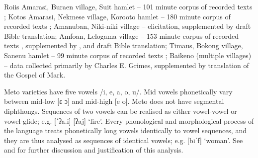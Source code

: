 \documentclass[output=paper]{langscibook}
\begin{document}
\begin{exe}
	\label{ex:SouMetDat}
 \ea Roi{\Q}is Amarasi, Buraen village, Suit hamlet
					 -- 101 minute corpus of recorded texts \citep{ed14-RoqisParadisec};
	 \ex Kotos Amarasi, Nekmese{\Q} village, Koro{\Q}oto hamlet
					 -- 180 minute corpus of recorded texts \citep{ed09-KotosParadisec};
	\ex Amanuban, Niki-niki village
				 -- elicitation, supplemented by draft Bible translation;{\footnotemark}
		 \ex Amfo{\Q}an, Lelogama village
				 -- 153  minute corpus of recorded texts \citep{cu17-AmfoanParadisec},
				supplemented by \citet{grsuorcu21}, and draft Bible translation; 
		 \ex Timaus, Bokong village, Sanenu hamlet
				 -- 99 minute corpus of recorded texts \citep{ed16-TimausParadisec};
		\ex Baikeno (multiple villages)
				 -- data collected primarily by Charles E. Grimes,{\footnotemark}
						supplemented by translation of the Gospel of Mark.
\z
\end{exe}

Meto varieties have five vowels /i, e, a, o, u/.
Mid vowels phonetically vary between mid-low [ɛ ɔ] and mid-high [e o].
Meto does not have segmental diphthongs.
Sequences of two vowels can be realised as either
vowel-vowel or vowel-glide; e.g.  {\ra} [ˈʔa.i] {\tl} [ʔaj] `fire'.
Every phonological and morphological process of the language
treats phonetically long vowels identically to vowel sequences,
and they are thus analysed as sequences of identical vowels;
e.g.  {\ra} \mbox{[bɪˈf]} `woman'.
See \citet[96--98]{ed20} and \citet[31--32]{ed18-MorphMet}
for further discussion and justification of this analysis.
\end{document}
